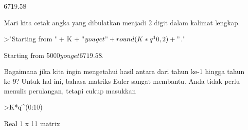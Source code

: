 \documentclass{article}
\begin{document}
\begin{eulernotebook}
\begin{euleroutput}
      6719.58 
\end{euleroutput}
\begin{eulercomment}
Mari kita cetak angka yang dibulatkan menjadi 2 digit dalam kalimat
lengkap.
\end{eulercomment}
\begin{eulerprompt}
>"Starting from " + K + "$ you get " + round(K*q^10,2) + "$."
\end{eulerprompt}
\begin{euleroutput}
  Starting from 5000$ you get 6719.58$.
\end{euleroutput}
\begin{eulercomment}
Bagaimana jika kita ingin mengetahui hasil antara dari tahun ke-1
hingga tahun ke-9? Untuk hal ini, bahasa matriks Euler sangat
membantu. Anda tidak perlu menulis perulangan, tetapi cukup masukkan
\end{eulercomment}
\begin{eulerprompt}
>K*q^(0:10)
\end{eulerprompt}
\begin{euleroutput}
  Real 1 x 11 matrix
  

\end{euleroutput}
\end{eulernotebook}
\end{document}
